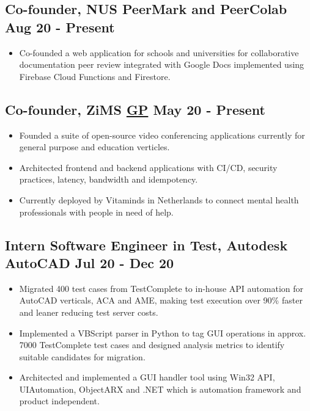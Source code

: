 \documentclass[12pts]{article}
\begin{document}
\subsection*{Co-founder, NUS PeerMark and PeerColab \href{https://youtu.be/LVmKodrE8e0}{\faYoutube} \hfill Aug 20 - Present}
\begin{itemize}
    \item Co-founded a web application for schools and universities for collaborative documentation peer review integrated with Google Docs implemented using Firebase Cloud Functions and Firestore.
\end{itemize}

\subsection*{Co-founder, ZiMS \href{https://github.com/zims-live}{\faGithub GP} \hfill May 20 - Present}
\begin{itemize}
    \item Founded a suite of open-source video conferencing applications currently for general purpose and education verticles.
    \item Architected frontend and backend applications with CI/CD, security practices, latency, bandwidth and idempotency.
    \item Currently deployed by Vitaminds in Netherlands to connect mental health professionals with people in need of help.
\end{itemize}

\subsection*{Intern Software Engineer in Test, Autodesk AutoCAD \hfill Jul 20 - Dec 20}
\begin{itemize}
    \item Migrated 400 test cases from TestComplete to in-house API automation for AutoCAD verticals, ACA and AME, making test execution over 90\% faster and leaner reducing test server costs.
    \item Implemented a VBScript parser in Python to tag GUI operations in approx. 7000 TestComplete test cases and designed analysis metrics to identify suitable candidates for migration.
    \item Architected and implemented a GUI handler tool using Win32 API, UIAutomation, ObjectARX and .NET which is automation framework and product independent.
\end{itemize}
\end{document}
